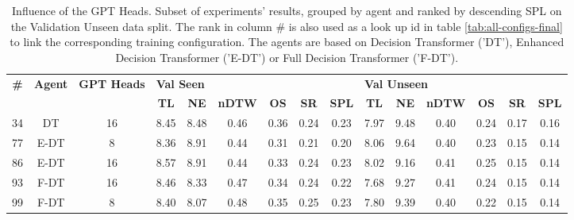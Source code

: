 \begin{table}
\centering
\caption{\label{tab:heads}Influence of the GPT Heads. Subset of experiments' results, grouped by agent and ranked by descending SPL on the Validation Unseen data split. The rank in column \# is also used as a look up id in table \ref{tab:all-configs-final} to link the corresponding training configuration.     \newline The agents are based on Decision Transformer ('DT'), Enhanced Decision Transformer ('E-DT') or Full Decision Transformer ('F-DT').}
\begin{tabular}{@{\hskip3pt}c@{\hskip3pt}c@{\hskip3pt}c@{\hskip3pt}c@{\hskip3pt}c@{\hskip3pt}c@{\hskip3pt}c@{\hskip3pt}c@{\hskip3pt}c@{\hskip3pt}c@{\hskip3pt}c@{\hskip3pt}c@{\hskip3pt}c@{\hskip3pt}c@{\hskip3pt}c}
\toprule
\textbf{\#} & \textbf{Agent} & \textbf{GPT Heads} & \multicolumn{6}{l}{\textbf{Val Seen}} & \multicolumn{6}{l}{\textbf{Val Unseen}} \\
 \cmidrule(l){4-9} \cmidrule(l){10-15} \textbf{~} &     \textbf{~} &         \textbf{~} &       \textbf{TL} & \textbf{NE} & \textbf{nDTW} & \textbf{OS} & \textbf{SR} & \textbf{SPL} &         \textbf{TL} & \textbf{NE} & \textbf{nDTW} & \textbf{OS} & \textbf{SR} & \textbf{SPL} \\
\midrule
         34 &             DT &                 16 &              8.45 &        8.48 &          0.46 &        0.36 &        0.24 &         0.23 &                7.97 &        9.48 &          0.40 &        0.24 &        0.17 &         0.16 \\
         77 &           E-DT &                  8 &              8.36 &        8.91 &          0.44 &        0.31 &        0.21 &         0.20 &                8.06 &        9.64 &          0.40 &        0.23 &        0.15 &         0.14 \\
         86 &           E-DT &                 16 &              8.57 &        8.91 &          0.44 &        0.33 &        0.24 &         0.23 &                8.02 &        9.16 &          0.41 &        0.25 &        0.15 &         0.14 \\
         93 &           F-DT &                 16 &              8.46 &        8.33 &          0.47 &        0.34 &        0.24 &         0.22 &                7.68 &        9.27 &          0.41 &        0.24 &        0.15 &         0.14 \\
         99 &           F-DT &                  8 &              8.40 &        8.07 &          0.48 &        0.35 &        0.25 &         0.23 &                7.80 &        9.39 &          0.40 &        0.22 &        0.15 &         0.14 \\
\bottomrule
\end{tabular}
\end{table}
